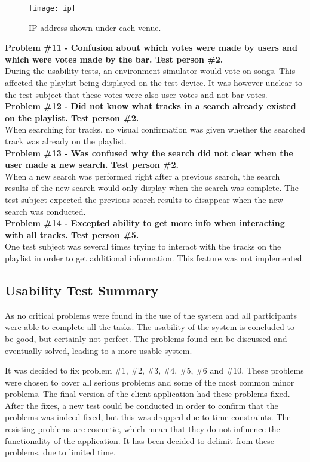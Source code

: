 \begin{figure}[hbtp]
  \centering
  \texttt{[image: ip]}
  \caption{IP-address shown under each venue.}\label{fig:ip}
\end{figure}

\noindent\textbf{Problem \#11 - Confusion about which votes were made by users and which were
    votes made by the bar. Test person \#2.}\\
  During the usability tests, an environment simulator would vote on
  songs. This affected the playlist being displayed on the test
  device. It was however unclear to the test subject that these votes
  were also user votes and not bar votes.\\

\noindent\textbf{Problem \#12 - Did not know what tracks in a search already existed on the
    playlist. Test person \#2.}\\
  When searching for tracks, no visual confirmation was given whether
  the searched track was already on the playlist.\\

\noindent\textbf{Problem \#13 - Was confused why the search did not
  clear when the user made a new search. Test person \#2.}\\
  When a new search was performed right after a previous search, the
  search results of the new search would only display when the search
  was complete. The test subject expected the previous search results
  to disappear when the new search was conducted.\\

\noindent\textbf{Problem \#14 - Excepted ability to get more info when interacting with all
    tracks. Test person \#5.}\\
  One test subject was several times trying to interact with the
  tracks on the playlist in order to get additional information. This
  feature was not implemented.

\subsection{Usability Test Summary}
As no critical problems were found in the use of the system and all participants were able to complete all the tasks. The usability of the system is concluded to be good, but certainly not perfect. The problems found can be discussed and eventually solved, leading to a more usable system.

It was decided to fix problem \#1, \#2, \#3, \#4, \#5, \#6 and
\#10. These problems were chosen to cover all serious problems and
some of the most common minor problems. The final version of the
client application had these problems fixed. After the fixes, a new test
could be conducted in order to confirm that the problems was indeed
fixed, but this was dropped due to time constraints. The resisting problems are cosmetic, which mean that they do not influence the functionality of the application. It has been decided to delimit from these problems, due to limited time. 

